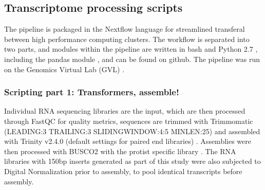 \documentclass[12pt]{article}
\begin{document}
\subsection*{Transcriptome processing scripts}
The pipeline is packaged in the Nextflow language \cite{nextflow} for streamlined transferal between high performance computing clusters. 
The workflow is separated into two parts, and modules within the pipeline are written in bash and Python 2.7 \cite{python}, including the pandas module \cite{pandas}, and can be found on github. 
The pipeline was run on the Genomics Virtual Lab (GVL) \cite{afgan2015genomics}.
\subsubsection*{Scripting part 1: Transformers, assemble!}
Individual RNA sequencing libraries are the input, which are then processed through FastQC \cite{fastqc} for quality metrics, sequences are trimmed with Trimmomatic (LEADING:3 TRAILING:3 SLIDINGWINDOW:4:5 MINLEN:25) \cite{bolger2014trimmomatic} and assembled with Trinity v2.4.0 (default settings for paired end libraries) \cite{haas2013novo}. 
Assemblies were then processed with BUSCO2 with the protist specific library \cite{simao2015busco}.
The RNA libraries with 150bp inserts generated as part of this study were also subjected to Digital Normalization \cite{diginorm} prior to assembly, to pool identical transcripts before assembly.                                                                                                                                                                                                                                                                                                                                                                                                                                                                                                                                                                                                                                                                                                                                                                                                                                                                                                                                                                                                                                                                                                                                                                                                                                                                                                                                           
\end{document}
